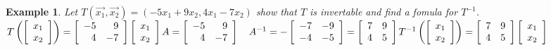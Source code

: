 \documentclass[a4paper,12pt,openany]{book}
\theoremstyle{defn}
\theoremstyle{expl}
\newtheorem{expl}{Example}[section]
\begin{document}
\begin{expl}\textup{Let $T(\vec{x_1},\vec{x_2})=(-5x_1+9x_2, 4x_1-7x_2)$ show that $T$ is invertable and find a fomula for $T^{-1}$.}\\
$T\left(\left[\begin{array}{c}x_1\\x_2\end{array}\right]\right)=\left[\begin{array}{rr}-5&9\\4&-7\end{array}\right]\left[\begin{array}{c}x_1\\x_2\end{array}\right]\\
A=\left[\begin{array}{rr}-5&9\\4&-7\end{array}\right]\quad A^{-1}=-\left[\begin{array}{rr}-7&-9\\-4&-5\end{array}\right]=\left[\begin{array}{rr}7&9\\4&5\end{array}\right]\\
T^{-1}\left(\left[\begin{array}{c}x_1\\x_2\end{array}\right]\right)=\left[\begin{array}{rr}7&9\\4&5\end{array}\right]\left[\begin{array}{c}x_1\\x_2\end{array}\right]$
\end{expl}
\addtocounter{section}{1}
\end{document}

